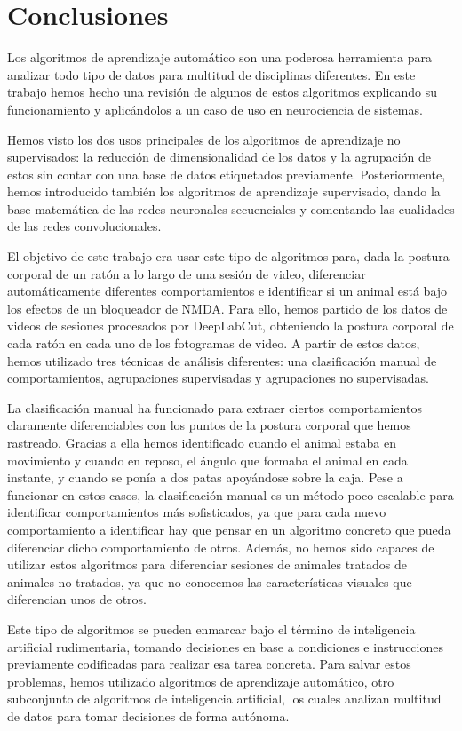 \chapter{Conclusiones}

Los algoritmos de aprendizaje automático son una poderosa herramienta para analizar todo tipo de datos para multitud de disciplinas diferentes. En este trabajo hemos hecho una revisión de algunos de estos algoritmos explicando su funcionamiento y aplicándolos a un caso de uso en neurociencia de sistemas.

Hemos visto los dos usos principales de los algoritmos de aprendizaje no supervisados: la reducción de dimensionalidad de los datos y la agrupación de estos sin contar con una base de datos etiquetados previamente. Posteriormente, hemos introducido también los algoritmos de aprendizaje supervisado, dando la base matemática de las redes neuronales secuenciales y comentando las cualidades de las redes convolucionales.

El objetivo de este trabajo era usar este tipo de algoritmos para, dada la postura corporal de un ratón a lo largo de una sesión de video, diferenciar automáticamente diferentes comportamientos e identificar si un animal está bajo los efectos de un bloqueador de NMDA. Para ello, hemos partido de los datos de videos de sesiones procesados por DeepLabCut, obteniendo la postura corporal de cada ratón en cada uno de los fotogramas de video. A partir de estos datos, hemos utilizado tres técnicas de análisis diferentes: una clasificación manual de comportamientos, agrupaciones supervisadas y agrupaciones no supervisadas.

La clasificación manual ha funcionado para extraer ciertos comportamientos claramente diferenciables con los puntos de la postura corporal que hemos rastreado. Gracias a ella hemos identificado cuando el animal estaba en movimiento y cuando en reposo, el ángulo que formaba el animal en cada instante, y cuando se ponía a dos patas apoyándose sobre la caja. Pese a funcionar en estos casos, la clasificación manual es un método poco escalable para identificar comportamientos más sofisticados, ya que para cada nuevo comportamiento a identificar hay que pensar en un algoritmo concreto que pueda diferenciar dicho comportamiento de otros. Además, no hemos sido capaces de utilizar estos algoritmos para diferenciar sesiones de animales tratados de animales no tratados, ya que no conocemos las características visuales que diferencian unos de otros.

Este tipo de algoritmos se pueden enmarcar bajo el término de inteligencia artificial rudimentaria, tomando decisiones en base a condiciones e instrucciones previamente codificadas para realizar esa tarea concreta. Para salvar estos problemas, hemos utilizado algoritmos de aprendizaje automático, otro subconjunto de algoritmos de inteligencia artificial, los cuales analizan multitud de datos para tomar decisiones de forma autónoma.

